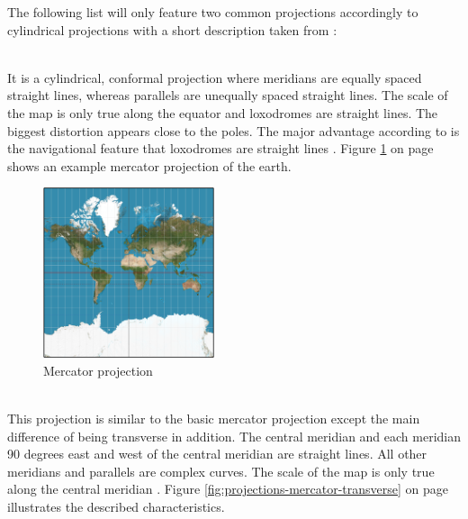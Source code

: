 The following list will only feature two common projections accordingly to cylindrical projections with a short description taken from \citeauthor{Snyder1987} :

\begin{enumerate}

 \hfill \\
It is a cylindrical, conformal projection where meridians are equally spaced straight lines, whereas parallels are unequally spaced straight lines. The scale of the map is only true along the equator and loxodromes are straight lines. The biggest distortion appears close to the poles. The major advantage according to \citeauthor{Snyder1987} is the navigational feature that loxodromes are straight lines . Figure \ref{fig:projections-mercator} on page \pageref{fig:projections-mercator} shows an example mercator projection of the earth.

\begin{figure}[!htb]
\centering
\includegraphics[height=5cm,keepaspectratio]{images/methods/projections/mercator.png}
\caption[
    Mercator projection, Urldate: 07.2016 \newline
    \small\texttt{\url{https://upload.wikimedia.org/wikipedia/commons/f/f0/MercNormSph.png}}.
]{Mercator projection}
\label{fig:projections-mercator}
\end{figure}


 \hfill \\
This projection is similar to the basic mercator projection except the main difference of being transverse in addition. The central meridian and each meridian 90 degrees east and west of the central meridian are straight lines. All other meridians and parallels are complex curves. The scale of the map is only true along the central meridian . Figure \ref{fig:projections-mercator-transverse} on page \pageref{fig:projections-mercator-transverse} illustrates the described characteristics.


\end{enumerate}
